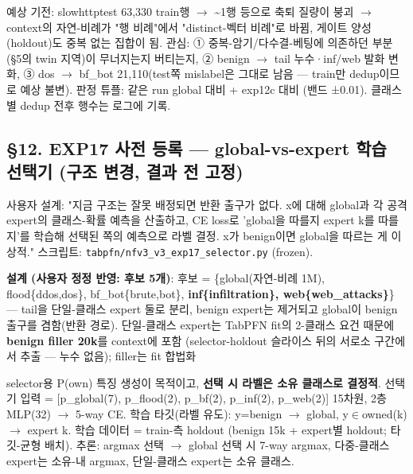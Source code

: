 예상 기전: slowhttptest 63,330 train행 \ensuremath{\rightarrow} \textasciitilde{}1행 등으로 축퇴 질량이 붕괴  \ensuremath{\rightarrow}  context의 자연-비례가 "행 비례"에서 "distinct-벡터 비례"로 바뀜, 게이트 양성(holdout)도 중복 없는 집합이 됨. 관심: ① 중복-암기/\allowbreak{}다수결-베팅에 의존하던 부분(§5의 twin 지역)이 무너지는지 버티는지, ② benign \ensuremath{\rightarrow} tail 누수·inf/\allowbreak{}web 발화 변화, ③ dos \ensuremath{\rightarrow} bf\_\allowbreak{}bot 21,110(test쪽 mislabel은 그대로 남음 — train만 dedup이므로 예상 불변). 판정 튜플: 같은 run global 대비 +\allowbreak{} exp12c 대비 (밴드 ±0.01). 클래스별 dedup 전후 행수는 로그에 기록.

\subsection{§12. EXP17 사전 등록 — global-vs-expert 학습 선택기 (구조 변경, 결과 전 고정)}
사용자 설계: "지금 구조는 잘못 배정되면 반환 출구가 없다. x에 대해 global과 각 공격 expert의 클래스-확률 예측을 산출하고, CE loss로 'global을 따를지 expert k를 따를지'를 학습해 선택된 쪽의 예측으로 라벨 결정. x가 benign이면 global을 따르는 게 이상적." 스크립트: \texttt{tabpfn/\allowbreak{}\allowbreak{}n\allowbreak{}fv3\_\allowbreak{}\allowbreak{}v3\_\allowbreak{}\allowbreak{}e\allowbreak{}xp17\_\allowbreak{}\allowbreak{}sel\allowbreak{}ector.\allowbreak{}py\allowbreak{}} (frozen).

\textbf{설계 (사용자 정정 반영: 후보 5개)}: 후보 =\allowbreak{} \{global(자연-비례 1M), flood\{ddos,dos\}, bf\_\allowbreak{}bot\{brute,bot\}, \textbf{inf\{infiltration\}, web\{web\_\allowbreak{}attacks\}}\} — tail을 단일-클래스 expert 둘로 분리, benign expert는 제거되고 global이 benign 출구를 겸함(반환 경로). 단일-클래스 expert는 TabPFN fit의 2-클래스 요건 때문에 \textbf{benign filler 20k}를 context에 포함 (selector-holdout 슬라이스 뒤의 서로소 구간에서 추출 — 누수 없음); filler는 fit 합법화

\par\noindent \textbullet\enspace selector용 P(own) 특징 생성이 목적이고, \textbf{선택 시 라벨은 소유 클래스로 결정적}. 선택기 입력 =\allowbreak{} [p\_\allowbreak{}global(7), p\_\allowbreak{}flood(2), p\_\allowbreak{}bf(2), p\_\allowbreak{}inf(2), p\_\allowbreak{}web(2)] 15차원, 2층 MLP(32)  \ensuremath{\rightarrow}  5-way CE. 학습 타깃(라벨 유도): y=\allowbreak{}benign  \ensuremath{\rightarrow}  global, y\ensuremath{\in}owned(k)  \ensuremath{\rightarrow}  expert k. 학습 데이터 =\allowbreak{} train-측 holdout (benign 15k +\allowbreak{} expert별 holdout; 타깃-균형 배치). 추론: argmax 선택  \ensuremath{\rightarrow}  global 선택 시 7-way argmax, 다중-클래스 expert는 소유-내 argmax, 단일-클래스 expert는 소유 클래스.


